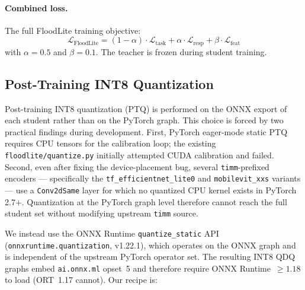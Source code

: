 \paragraph{Combined loss.} The full FloodLite training objective:
\begin{equation}
\mathcal{L}_{\mathrm{FloodLite}} = (1 - \alpha) \cdot \mathcal{L}_{\mathrm{task}} + \alpha \cdot \mathcal{L}_{\mathrm{resp}} + \beta \cdot \mathcal{L}_{\mathrm{feat}}
\label{eq:combined}
\end{equation}
with $\alpha=0.5$ and $\beta=0.1$. The teacher is frozen during student training.

\subsection{Post-Training INT8 Quantization}
\label{sec:methods-ptq}

Post-training INT8 quantization (PTQ) is performed on the ONNX export of each student rather than on the PyTorch graph. This choice is forced by two practical findings during development. First, PyTorch eager-mode static PTQ requires CPU tensors for the calibration loop; the existing \texttt{floodlite/quantize.py} initially attempted CUDA calibration and failed. Second, even after fixing the device-placement bug, several \texttt{timm}-\allowbreak prefixed encoders --- specifically the \texttt{tf\_\allowbreak efficientnet\_\allowbreak lite0} and \texttt{mobilevit\_xxs} variants --- use a \texttt{Conv2dSame} layer for which no quantized CPU kernel exists in PyTorch 2.7$+$. Quantization at the PyTorch graph level therefore cannot reach the full student set without modifying upstream \texttt{timm} source.

We instead use the ONNX Runtime \texttt{quantize\_static} API~\cite{ortQuant} (\texttt{onnxruntime.quantization}, v1.22.1), which operates on the ONNX graph and is independent of the upstream PyTorch operator set. The resulting INT8 QDQ graphs embed \texttt{ai.onnx.ml} opset~5 and therefore require ONNX Runtime~$\geq 1.18$ to load (ORT~1.17 cannot). Our recipe is:

